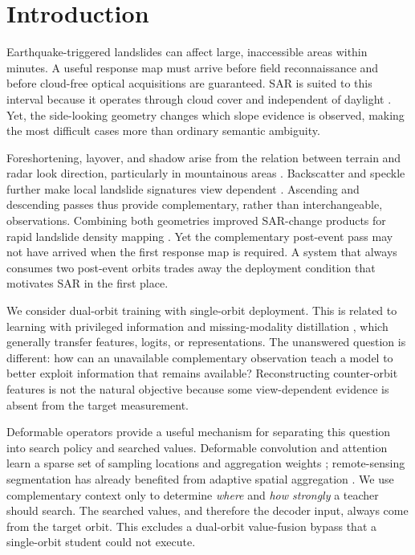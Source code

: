 \section{Introduction}
\label{sec:introduction}

Earthquake-triggered landslides can affect large, inaccessible areas within minutes. A useful response map must arrive before field reconnaissance and before cloud-free optical acquisitions are guaranteed. SAR is suited to this interval because it operates through cloud cover and independent of daylight \cite{Mondini2021,Handwerger2022,Amatya2023}. Yet, the side-looking geometry changes which slope evidence is observed, making the most difficult cases more than ordinary semantic ambiguity.

Foreshortening, layover, and shadow arise from the relation between terrain and radar look direction, particularly in mountainous areas \cite{Mondini2021,Shi2024}. Backscatter and speckle further make local landslide signatures view dependent \cite{Santangelo2022}. Ascending and descending passes thus provide complementary, rather than interchangeable, observations. Combining both geometries improved SAR-change products for rapid landslide density mapping \cite{Handwerger2022}. Yet the complementary post-event pass may not have arrived when the first response map is required. A system that always consumes two post-event orbits trades away the deployment condition that motivates SAR in the first place.

We consider dual-orbit training with single-orbit deployment. This is related to learning with privileged information \cite{LopezPaz2016} and missing-modality distillation \cite{Li2022,Liu2024}, which generally transfer features, logits, or representations. The unanswered question is different: how can an unavailable complementary observation teach a model to better exploit information that remains available? Reconstructing counter-orbit features is not the natural objective because some view-dependent evidence is absent from the target measurement.

Deformable operators provide a useful mechanism for separating this question into search policy and searched values. Deformable convolution and attention learn a sparse set of sampling locations and aggregation weights \cite{Dai2017,Zhu2021}; remote-sensing segmentation has already benefited from adaptive spatial aggregation \cite{Zuo2022,Dai2023}. We use complementary context only to determine \emph{where} and \emph{how strongly} a teacher should search. The searched values, and therefore the decoder input, always come from the target orbit. This excludes a dual-orbit value-fusion bypass that a single-orbit student could not execute.

